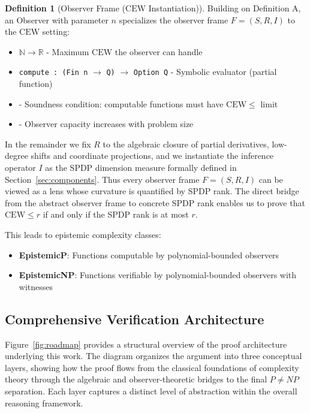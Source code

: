 \documentclass[12pt]{article}
\theoremstyle{definition}
\newtheorem{definition}{Definition}
\theoremstyle{definition}
\theoremstyle{remark}
\theoremstyle{remark}
\begin{document}
\begin{definition}[Observer Frame ($\mathrm{CEW}$ Instantiation)]\label{def:observer}
Building on Definition A, an Observer with parameter $n$ specializes the observer frame $F = (S, R, I)$ to the $\mathrm{CEW}$ setting:
\begin{itemize}
\item {} $\mathbb{N} \to \mathbb{R}$ - Maximum $\mathrm{CEW}$ the observer can handle
\item \texttt{compute : (Fin n} $\to$ \texttt{Q)} $\to$ \texttt{Option Q} - Symbolic evaluator (partial function)
\item {} - Soundness condition: computable functions must have $\mathrm{CEW} \leq$ limit
\item {} - Observer capacity increases with problem size
\end{itemize}
\end{definition}

In the remainder we fix $R$ to the algebraic closure of partial derivatives, low-degree shifts and coordinate projections, and we instantiate the inference operator $I$ as the SPDP dimension measure formally defined in Section~\ref{sec:components}. Thus every observer frame $F = (S, R, I)$ can be viewed as a lens whose curvature is quantified by SPDP rank. The direct bridge from the abstract observer frame to concrete SPDP rank enables us to prove that $\mathrm{CEW} \leq r$ if and only if the SPDP rank is at most $r$.

This leads to epistemic complexity classes:
\begin{itemize}
\item \textbf{EpistemicP}: Functions computable by polynomial-bounded observers
\item \textbf{EpistemicNP}: Functions verifiable by polynomial-bounded observers with witnesses
\end{itemize}

\subsection{Comprehensive Verification Architecture}

Figure~\ref{fig:roadmap} provides a structural overview of the proof architecture underlying this work. The diagram organizes the argument into three conceptual layers, showing how the proof flows from the classical foundations of complexity theory through the algebraic and observer-theoretic bridges to the final $P \neq NP$ separation. Each layer captures a distinct level of abstraction within the overall reasoning framework.
\end{document}
